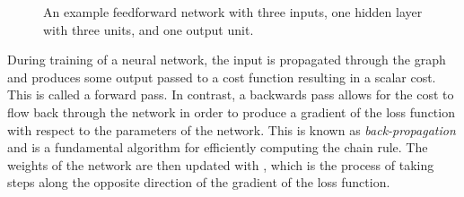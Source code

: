 \begin{figure}
\caption{An example feedforward network with three inputs, one hidden layer with three units, and one output unit.}
\label{fig:mlp}

\end{figure}

During training of a neural network, the input is propagated through the graph and produces some output passed to a cost function resulting in a scalar cost. This is called a forward pass. In contrast, a backwards pass allows for the cost to flow back through the network in order to produce a gradient of the loss function with respect to the parameters of the network. This is known as \emph{back-propagation} and is a fundamental algorithm for efficiently computing the chain rule. The weights of the network are then updated with , which is the process of taking steps along the opposite direction of the gradient of the loss function. %


